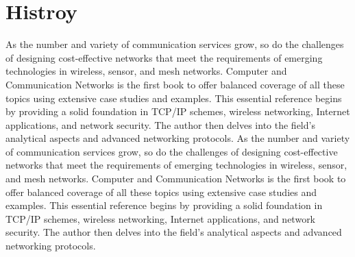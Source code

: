 \section{Histroy}
As the number and variety of communication services grow, so do the challenges of designing cost-effective networks that meet the requirements of emerging technologies in wireless, sensor, and mesh networks. Computer and Communication Networks is the first book to offer balanced coverage of all these topics using extensive case studies and examples.
This essential reference begins by providing a solid foundation in TCP/IP schemes, wireless networking, Internet applications, and network security. The author then delves into the field's analytical aspects and advanced networking protocols.
As the number and variety of communication services grow, so do the challenges of designing cost-effective networks that meet the requirements of emerging technologies in wireless, sensor, and mesh networks. Computer and Communication Networks is the first book to offer balanced coverage of all these topics using extensive case studies and examples.
This essential reference begins by providing a solid foundation in TCP/IP schemes, wireless networking, Internet applications, and network security. The author then delves into the field's analytical aspects and advanced networking protocols.

